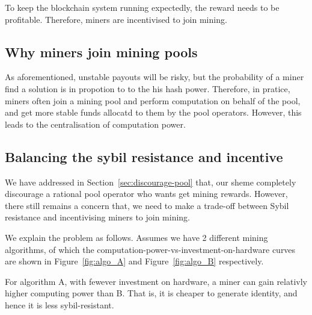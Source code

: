 To keep the blockchain system running expectedly, the reward needs to be profitable.
Therefore, miners are incentivised to join mining.

\subsection{Why miners join mining pools}

As aforementioned, unstable payouts will be risky, but the probability of a miner find a solution is in propotion to to the his hash power.
Therefore, in pratice, miners often join a mining pool and perform computation on behalf of the pool, and get more stable funds allocatd to them by the pool operators.
However, this leads to the centralisation of computation power.

\subsection{Balancing the sybil resistance and incentive}

We have addressed in Section~\ref{sec:discourage-pool} that, our sheme completely discourage a rational pool operator who wants get mining rewards.
However, there still remains a concern that, we need to make a trade-off between Sybil resistance and incentivising miners to join mining.




We explain the problem as follows. Assumes we have 2 different mining algorithms, of which the computation-power-vs-investment-on-hardware curves are shown in Figure~\ref{fig:algo_A} and Figure~\ref{fig:algo_B} respectively.

For algorithm A, with fewever investment on hardware, a miner can gain relativly higher computing power than B. That is, it is cheaper to generate identity, and hence it is less sybil-resistant.

